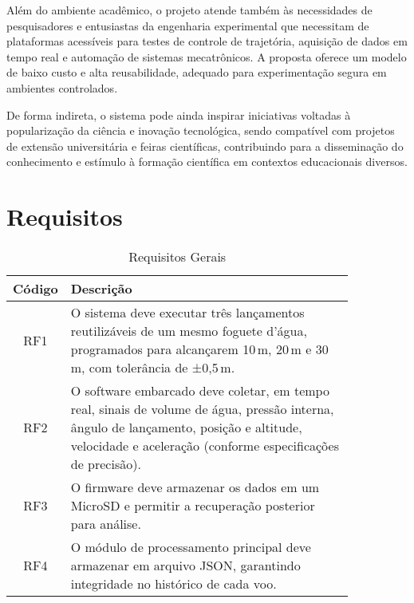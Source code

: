Além do ambiente acadêmico, o projeto atende também às necessidades de pesquisadores e entusiastas da engenharia experimental que necessitam de plataformas acessíveis para testes de controle de trajetória, aquisição de dados em tempo real e automação de sistemas mecatrônicos. A proposta oferece um modelo de baixo custo e alta reusabilidade, adequado para experimentação segura em ambientes controlados.

De forma indireta, o sistema pode ainda inspirar iniciativas voltadas à popularização da ciência e inovação tecnológica, sendo compatível com projetos de extensão universitária e feiras científicas, contribuindo para a disseminação do conhecimento e estímulo à formação científica em contextos educacionais diversos.

\section{Requisitos}

\begin{table}[htpb]
\centering
\scriptsize
\setlength{\tabcolsep}{4pt}
\caption{Requisitos Gerais}
\begin{tabular}{|c|p{0.85\linewidth}|}
\hline
\textbf{Código} & \textbf{Descrição} \\
\hline
RF1 & O sistema deve executar três lançamentos reutilizáveis de um mesmo foguete d'água, programados para alcançarem 10\,m, 20\,m e 30\,m, com tolerância de ±0,5\,m. \\
\hline
RF2 & O software embarcado deve coletar, em tempo real, sinais de volume de água, pressão interna, ângulo de lançamento, posição e altitude, velocidade e aceleração (conforme especificações de precisão). \\
\hline
RF3 & O firmware deve armazenar os dados em um MicroSD e permitir a recuperação posterior para análise. \\
\hline
RF4 & O módulo de processamento principal deve armazenar em arquivo JSON, garantindo integridade no histórico de cada voo. \\
\hline
\end{tabular}
\label{tab:requisitos-funcionais}
\end{table}


